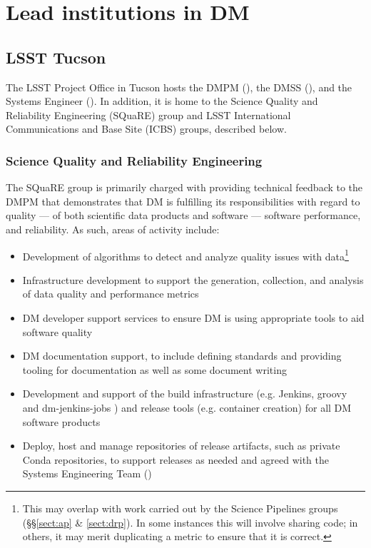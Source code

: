 \section{Lead institutions in \gls{DM} \label{sect:leadtutes}}

\subsection{LSST Tucson\label{sect:tucson}}

The \gls{LSST} Project Office in Tucson hosts the \gls{DMPM} (), the \gls{DMSS} (), and the \gls{Systems Engineer} ().
In addition, it is home to the Science Quality and Reliability Engineering (\gls{SQuaRE}) group and \gls{LSST} International Communications and Base Site (\gls{ICBS}) groups, described below.

\subsubsection{Science Quality and Reliability Engineering \label{sect:square}}

The \gls{SQuaRE} group is primarily charged with providing technical feedback to the \gls{DMPM} that demonstrates that \gls{DM} is fulfilling its responsibilities with regard to quality — of both scientific data products and software — software performance, and reliability. As such, areas of activity include:

\begin{itemize}

\item Development of algorithms to detect and analyze quality issues with data\footnote{This may overlap with work carried out by the \gls{Science Pipelines} groups (\S\S\ref{sect:ap} \& \ref{sect:drp}). In some instances this will involve sharing code; in others, it may merit duplicating a \gls{metric} to ensure that it is correct.}

\item Infrastructure development to support the generation, collection, and analysis of data quality and performance metrics

\item \gls{DM} developer support services to ensure \gls{DM} is using appropriate tools to aid software quality

\item \gls{DM} documentation support, to include defining standards and providing tooling for documentation as well as some document writing

\item Development and support of the build infrastructure (e.g. Jenkins,  groovy and dm-jenkins-jobs ) and release tools (e.g. container creation) for all \gls{DM} software products

\item Deploy, host and manage repositories of release artifacts, such as private Conda repositories, to support releases as needed and agreed with the Systems Engineering Team ()

\end{itemize}

